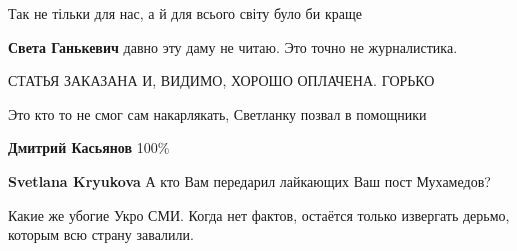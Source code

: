 \begin{itemize}
\begin{itemize}
Так не тільки для нас, а й для всього світу було би краще

 
\textbf{Света Ганькевич} давно эту даму не читаю. Это точно не журналистика.

 
СТАТЬЯ ЗАКАЗАНА И, ВИДИМО, ХОРОШО ОПЛАЧЕНА. ГОРЬКО

 
Это кто то не смог сам накарлякать, Светланку позвал в помощники

 
\textbf{Дмитрий Касьянов} 100\%

 
\textbf{Svetlana Kryukova} А кто Вам передарил лайкающих Ваш пост Мухамедов?

 

Какие же убогие Укро СМИ. Когда нет фактов, остаётся только извергать дерьмо, которым всю страну завалили.

 

\end{itemize}
\end{itemize}
